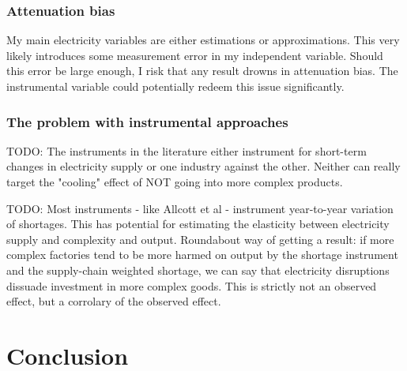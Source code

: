 \documentclass[11pt]{article}
\begin{document}
\subsubsection{Attenuation bias}
\label{sec:orge917ac0}
My main electricity variables are either estimations or approximations. This very likely introduces some measurement error in my independent variable. Should this error be large enough, I risk that any result drowns in attenuation bias. The instrumental variable could potentially redeem this issue significantly.

\subsubsection{The problem with instrumental approaches}
\label{sec:orge917ac0}

TODO: The instruments in the literature either instrument for short-term changes in electricity supply or one industry against the other. Neither can really target the "cooling" effect of NOT going into more complex products.

TODO: Most instruments - like Allcott et al - instrument year-to-year variation of shortages. This has potential for estimating the elasticity between electricity supply and complexity and output. Roundabout way of getting a result: if more complex factories tend to be more harmed on output by the shortage instrument and the supply-chain weighted shortage, we can say that electricity disruptions dissuade investment in more complex goods. This is strictly not an observed effect, but a corrolary of the observed effect.



\newpage

\section{Conclusion}%
\label{sec:conclusion}


\newpage


\end{document}
